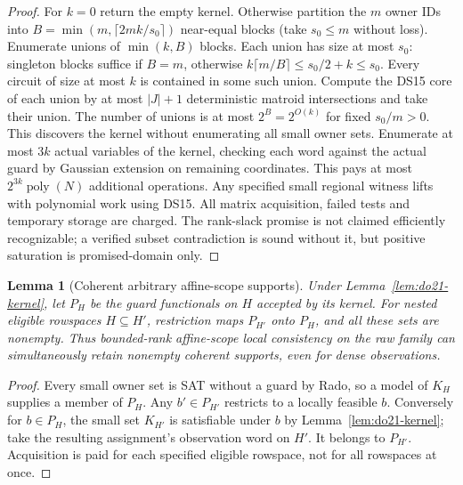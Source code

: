 \documentclass[11pt]{article}
\newtheorem{lemma}[theorem]{Lemma}
\begin{document}
\begin{proof}
For $k=0$ return the empty kernel. Otherwise partition the $m$ owner IDs into $B=\min(m,\lceil2mk/s_0\rceil)$ near-equal blocks (take $s_0\le m$ without loss). Enumerate unions of $\min(k,B)$ blocks. Each union has size at most $s_0$: singleton blocks suffice if $B=m$, otherwise $k\lceil m/B\rceil\le s_0/2+k\le s_0$. Every circuit of size at most $k$ is contained in some such union. Compute the DS15 core of each union by at most $|J|+1$ deterministic matroid intersections and take their union. The number of unions is at most $2^B=2^{O(k)}$ for fixed $s_0/m>0$. This discovers the kernel without enumerating all small owner sets. Enumerate at most $3k$ actual variables of the kernel, checking each word against the actual guard by Gaussian extension on remaining coordinates. This pays at most $2^{3k}\operatorname{poly}(N)$ additional operations. Any specified small regional witness lifts with polynomial work using DS15. All matrix acquisition, failed tests and temporary storage are charged. The rank-slack promise is not claimed efficiently recognizable; a verified subset contradiction is sound without it, but positive saturation is promised-domain only.
\end{proof}

\begin{lemma}[Coherent arbitrary affine-scope supports]\label{lem:do21-coherent}
Under Lemma~\ref{lem:do21-kernel}, let $P_H$ be the guard functionals on $H$ accepted by its kernel. For nested eligible rowspaces $H\subseteq H'$, restriction maps $P_{H'}$ onto $P_H$, and all these sets are nonempty. Thus bounded-rank affine-scope local consistency on the raw family can simultaneously retain nonempty coherent supports, even for dense observations.
\end{lemma}
\begin{proof}
Every small owner set is SAT without a guard by Rado, so a model of $K_H$ supplies a member of $P_H$. Any $b'\in P_{H'}$ restricts to a locally feasible $b$. Conversely for $b\in P_H$, the small set $K_{H'}$ is satisfiable under $b$ by Lemma~\ref{lem:do21-kernel}; take the resulting assignment's observation word on $H'$. It belongs to $P_{H'}$. Acquisition is paid for each specified eligible rowspace, not for all rowspaces at once.
\end{proof}
\end{document}
